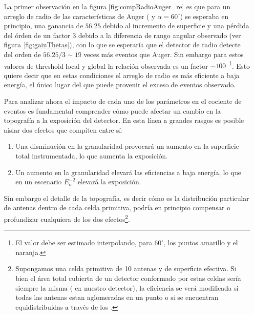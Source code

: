 	La primer observaci\'on en la figura \ref{fig:compRadioAuger_re} es que para un arreglo de radio de las caracter\'isticas de Auger ( y $\alpha=60^\circ$) se esperaba en principio, una ganancia de $56.25$ debido al incremento de superficie y una p\'erdida del \'orden de un factor $3$ debido a la diferencia de rango angular observado (ver figura \ref{fig:gainThetas}), con lo que se esperar\'ia que el detector de radio detecte del orden de $56.25/3\sim19$ veces m\'as eventos que Auger. 
	Sin embargo para estos valores de threshold local y global la relaci\'on observada es un factor $\sim100$~\footnote{El valor debe ser estimado interpolando, para $60^\circ$, los puntos amarillo y el naranja.}.
	Esto quiere decir que en estas condiciones el arreglo de radio es m\'as eficiente a baja energ\'ia, el \'unico lugar del que puede provenir el exceso de eventos observado.
	
	Para analizar ahora el impacto de cada uno de los par\'ametros en el cociente de eventos es fundamental comprender c\'omo puede afectar un cambio en la topograf\'ia a la exposici\'on del detector. En esta l\'inea a grandes rasgos es posible aislar dos efectos que compiten entre s\'i:
	\begin{enumerate}
	 \item Una disminuci\'on en la granularidad provocar\'a un aumento en la superficie total instrumentada, lo que aumenta la exposici\'on.
	 \item Un aumento en la granularidad elevar\'a las eficiencias a baja energ\'ia, lo que en un escenario $E_\nu^{-2}$ elevar\'a la exposici\'on.
	\end{enumerate}
	Sin embargo el detalle de la topograf\'ia, es decir c\'omo es la distribuci\'on particular de antenas dentro de cada celda primitiva, podr\'ia en principio compensar o profundizar cualquiera de los dos efectos\footnote{Supongamos una celda primitiva de 10 antenas y  de superficie efectiva. Si bien el \'area total cubierta de un detector conformado por estas celdas ser\'ia siempre la misma ( en nuestro detector), la eficiencia se ver\'a modificada si todas las antenas estan aglomeradas en un punto o si se encuentran equidistribuidas a trav\'es de los .}.
	
